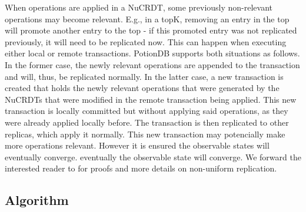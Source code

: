 \documentclass{vldb}
\begin{document}
When operations are applied in a NuCRDT, some previously non-relevant operations may become relevant.
E.g., in a topK, removing an entry in the top will promote another entry to the top - if this promoted entry was not replicated previously, it will need to be replicated now.
This can happen when executing either local or remote transactions.
PotionDB supports both situations as follows.
In the former case, the newly relevant operations are appended to the transaction and will, thus, be replicated normally.
In the latter case, a new transaction is created that holds the newly relevant operations that were generated by the NuCRDTs that were modified in the remote transaction being applied.
This new transaction is locally committed but without applying said operations, as they were already applied locally before.
The transaction is then replicated to other replicas, which apply it normally.
This new transaction may potencially make more operations relevant.
However it is ensured the observable states will eventually converge.
eventually the observable state will converge.
We forward the interested reader to \cite{Cabrita17Nonuniform} for proofs and more details on non-uniform replication.

\subsection{Algorithm}
\end{document}
